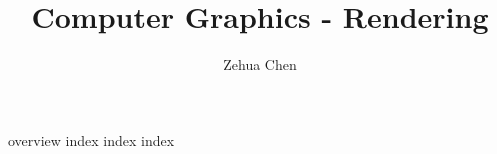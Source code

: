 \documentclass[letterpaper, 11pt]{report}
\title{Computer Graphics - Rendering}
\author{Zehua Chen}
\begin{document}
  \maketitle
  \tableofcontents

  \setmainstyles

  {overview}
  {index}
  {index}
  {index}

  \newpage
  \printglossaries
\end{document}
